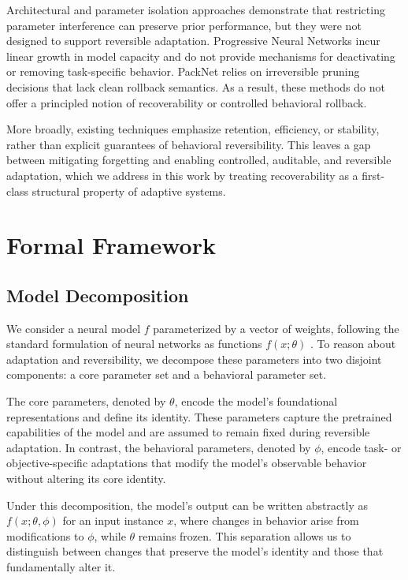 \documentclass{article}
\begin{document}
	Architectural and parameter isolation approaches demonstrate that restricting parameter interference can preserve prior performance, but they were not designed to support reversible adaptation. Progressive Neural Networks \cite{rusu2016progressive} incur linear growth in model capacity and do not provide mechanisms for deactivating or removing task-specific behavior. PackNet \cite{mallya2018packnet} relies on irreversible pruning decisions that lack clean rollback semantics. As a result, these methods do not offer a principled notion of recoverability or controlled behavioral rollback.
	
	More broadly, existing techniques emphasize retention, efficiency, or stability, rather than explicit guarantees of behavioral reversibility. This leaves a gap between mitigating forgetting and enabling controlled, auditable, and reversible adaptation, which we address in this work by treating recoverability as a first-class structural property of adaptive systems.
	
	\section{Formal Framework}
	\label{sec:formalmath}
	
	\subsection{Model Decomposition}
	\label{sec:model_decomposition}
	
	We consider a neural model $f$ parameterized by a vector of weights, following the standard formulation of neural networks as functions $f(x;\theta)$ \cite{Goodfellow-et-al-2016}. To reason about adaptation and reversibility, we decompose these parameters into two disjoint components: a core parameter set and a behavioral parameter set.
	
	The core parameters, denoted by $\theta$, encode the model’s foundational representations and define its identity. These parameters capture the pretrained capabilities of the model and are assumed to remain fixed during reversible adaptation. In contrast, the behavioral parameters, denoted by $\phi$, encode task- or objective-specific adaptations that modify the model’s observable behavior without altering its core identity.
	
	Under this decomposition, the model’s output can be written abstractly as $f(x;\theta,\phi)$ for an input instance $x$, where changes in behavior arise from modifications to $\phi$, while $\theta$ remains frozen. This separation allows us to distinguish between changes that preserve the model’s identity and those that fundamentally alter it.
	
\end{document}
